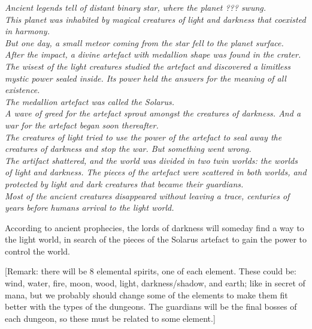 \documentclass[12pt,a4paper]{report}
\begin{document}
{\it
Ancient legends tell of distant binary star, where the planet ??? swung.  \\

This planet was inhabited by magical creatures of light and darkness that coexisted in harmony. \\

But one day, a small meteor coming from the star fell to the planet surface. \\

After the impact, a divine artefact with medallion shape was found in the crater. \\

The wisest of the light creatures studied the artefact and discovered a limitless mystic power sealed inside.
Its power held the answers for the meaning of all existence. \\

The medallion artefact was called the Solarus. \\

A wave of greed for the artefact sprout amongst the creatures of darkness.
And a war for the artefact began soon thereafter. \\

The creatures of light tried to use the power of the artefact to seal away the creatures of darkness and stop the war.
But something went wrong. \\

The artifact shattered, and the world was divided in two twin worlds: the worlds of light and darkness.
The pieces of the artefact were scattered in both worlds, and protected by light and dark creatures that became their guardians. \\

Most of the ancient creatures disappeared without leaving a trace, centuries of years before humans arrival to the light world.

According to ancient prophecies, the lords of darkness will someday find a way to the light world, in search of the pieces
of the Solarus artefact to gain the power to control the world.
} %

[Remark: there will be 8 elemental spirits, one of each element. These could be: wind, water, fire, moon, wood, light,
darkness/shadow, and earth; like in secret of mana, but we probably should change some of the elements to make them fit better
with the types of the dungeons. The guardians will be the final bosses of each dungeon, so these must be related to some element.]
\end{document}
